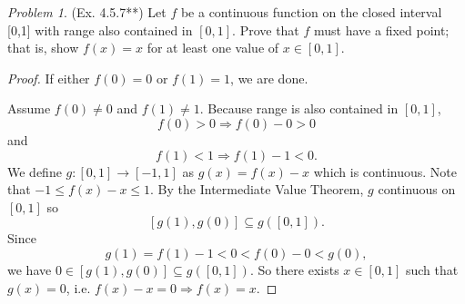 \documentclass[11pt,twoside, reqno]{amsart}
\theoremstyle{remark}
\newtheorem{Prob}{Problem}
\renewcommand{\implies}{\Rightarrow}
\begin{document}
\begin{Prob}(Ex. 4.5.7**) Let $f$ be a continuous function on the closed interval [0,1] with range also contained in $[0,1]$. Prove that $f$ must have a fixed point; that is, show $f(x) = x$ for at least one value of $x \in [0,1]$.
\end{Prob}

\begin{proof}
If either $f(0) = 0$ or $f(1) = 1$, we are done.

Assume $f(0) \neq 0$ and $f(1) \neq 1$. Because range is also contained in $[0,1]$, 
$$
    f(0) > 0 \implies f(0) - 0 > 0
$$
and 
$$
    f(1) < 1 \implies f(1) - 1 < 0.
$$
We define $g:[0,1] \to [-1,1]$ as $g(x) = f(x) - x$ which is continuous. Note that $-1 \leq f(x) - x \leq 1$. By the Intermediate Value Theorem, $g$ continuous on $[0,1]$ so
$$
    [g(1),g(0)] \subseteq g([0,1]).
$$
Since 
$$
g(1) = f(1) - 1 < 0 < f(0) - 0 < g(0),
$$
we have $0 \in [g(1),g(0)] \subseteq g([0,1])$. So there exists $x \in [0,1]$ such that $g(x) = 0$, i.e. $f(x) - x = 0 \implies f(x) = x$.

\end{proof}
\end{document}
